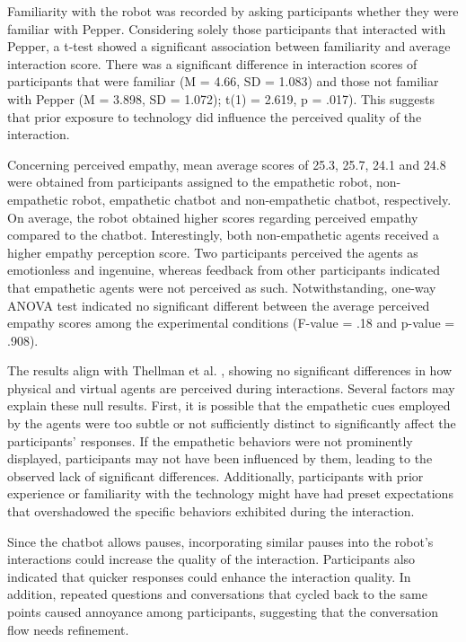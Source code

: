 \documentclass[runningheads]{llncs}
\begin{document}
Familiarity with the robot was recorded by asking participants whether they were familiar with Pepper. Considering solely those participants that interacted with Pepper, a t-test showed a significant association between familiarity and average interaction score. There was a significant difference in interaction scores of participants that were familiar (M = 4.66, SD = 1.083) and those not familiar with Pepper (M = 3.898, SD = 1.072); t(1) = 2.619, p = .017). This suggests that prior exposure to technology did influence the perceived quality of the interaction.

Concerning perceived empathy, mean average scores of 25.3, 25.7, 24.1 and 24.8 were obtained from participants assigned to the empathetic robot, non-empathetic robot, empathetic chatbot and non-empathetic chatbot, respectively. On average, the robot obtained higher scores regarding perceived empathy compared to the chatbot. Interestingly, both non-empathetic agents received a higher empathy perception score. Two participants perceived the agents as emotionless and ingenuine, whereas feedback from other participants indicated that empathetic agents were not perceived as such. Notwithstanding, one-way ANOVA test indicated no significant different between the average perceived empathy scores among the experimental conditions (F-value = .18 and p-value = .908).

The results align with Thellman et al. \cite{thellman2016physical}, showing no significant differences in how physical and virtual agents are perceived during interactions. Several factors may explain these null results. First, it is possible that the empathetic cues employed by the agents were too subtle or not sufficiently distinct to significantly affect the participants' responses. If the empathetic behaviors were not prominently displayed, participants may not have been influenced by them, leading to the observed lack of significant differences. Additionally, participants with prior experience or familiarity with the technology might have had preset expectations that overshadowed the specific behaviors exhibited during the interaction.

Since the chatbot allows pauses, incorporating similar pauses into the robot’s interactions could increase the quality of the interaction. Participants also indicated that quicker responses could enhance the interaction quality. In addition, repeated questions and conversations that cycled back to the same points caused annoyance among participants, suggesting that the conversation flow needs refinement.
\end{document}
